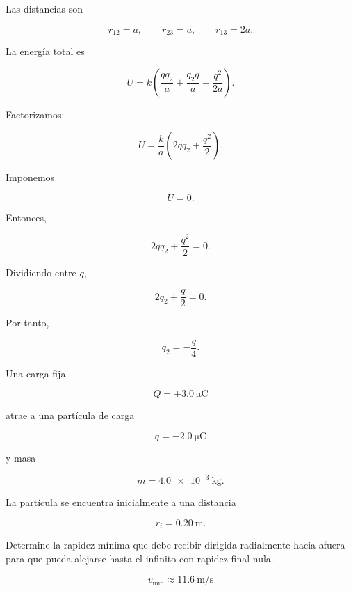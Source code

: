 \begin{explicacion}

Las distancias son

\[
r_{12}=a,
\qquad
r_{23}=a,
\qquad
r_{13}=2a.
\]

La energía total es

\[
U
=
k
\left(
\frac{qq_2}{a}
+
\frac{q_2q}{a}
+
\frac{q^2}{2a}
\right).
\]

Factorizamos:

\[
U
=
\frac{k}{a}
\left(
2qq_2+\frac{q^2}{2}
\right).
\]

Imponemos

\[
U=0.
\]

Entonces,

\[
2qq_2+\frac{q^2}{2}=0.
\]

Dividiendo entre \(q\),

\[
2q_2+\frac{q}{2}=0.
\]

Por tanto,

\[
\boxed{q_2=-\frac{q}{4}}.
\]

\end{explicacion}


\begin{ejercicio}

Una carga fija

\[
Q=+\SI{3.0}{\micro\coulomb}
\]

atrae a una partícula de carga

\[
q=-\SI{2.0}{\micro\coulomb}
\]

y masa

\[
m=\SI{4.0e-3}{\kilogram}.
\]

La partícula se encuentra inicialmente a una distancia

\[
r_i=\SI{0.20}{\metre}.
\]

Determine la rapidez mínima que debe recibir dirigida radialmente hacia afuera para
que pueda alejarse hasta el infinito con rapidez final nula.

\end{ejercicio}

\begin{respuesta}

\[
\boxed{v_{\min}\approx\SI{11.6}{\metre\per\second}}
\]

\end{respuesta}

